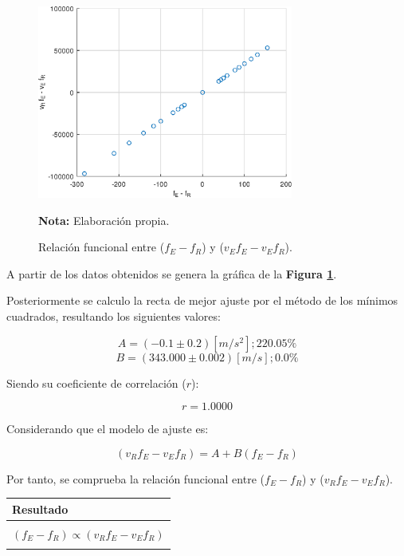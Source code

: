 \documentclass[letter,11pt]{article}
\newcommand{\source}[1]{\vspace{-11pt} \caption*{\small{\textbf{Nota:} {#1}}}}
\begin{document}
\begin{figure}
\centering
\includegraphics[width=0.75\textwidth]{resources/o3.eps}
\caption{Relación funcional entre ($f_E - f_R$) y ($v_E f_E - v_E f_R$).}
\label{figura7}
\source{Elaboración propia.}
\end{figure}

A partir de los datos obtenidos se genera la gráfica de la
\textbf{Figura \ref{figura7}}.

Posteriormente se calculo la recta de mejor ajuste por el método de los mínimos
cuadrados, resultando los siguientes valores:

\begin{equation*}
    A = (-0.1 \pm 0.2) [m/s^2]; 220.05\%
\end{equation*}
\begin{equation*}
    B = (343.000 \pm 0.002) [m/s]; 0.0\%
\end{equation*}
\vspace{0.10cm}

Siendo su coeficiente de correlación ($r$):

\begin{equation*}
    r = 1.0000
\end{equation*}
\vspace{0.10cm}

Considerando que el modelo de ajuste es:

\begin{equation*}
    (v_R f_E - v_E f_R) = A + B (f_E - f_R)
\end{equation*}
\vspace{0.10cm}

Por tanto, se comprueba la relación funcional entre ($f_E - f_R$) y
($v_R f_E - v_E f_R$).

\begin{center}
\begin{tabular}{|>{\centering}m{9.2cm}<{\centering}|}
\hline
\textbf{Resultado} 
\tabularnewline \hline
\\
$(f_E - f_R) \propto (v_R f_E - v_E f_R)$ \tabularnewline
\\
\hline
\end{tabular}
\end{center}
\end{document}
